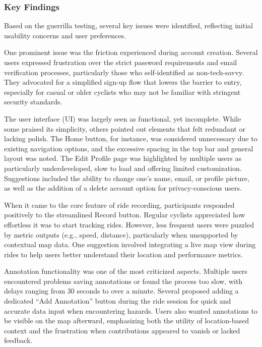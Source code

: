 \subsubsection{Key Findings}

Based on the guerrilla testing, several key issues were identified, reflecting initial usability concerns and user preferences.

One prominent issue was the friction experienced during account creation. Several users expressed frustration over the strict password requirements and email verification processes, particularly those who self-identified as non-tech-savvy. They advocated for a simplified sign-up flow that lowers the barrier to entry, especially for casual or older cyclists who may not be familiar with stringent security standards.

The user interface (UI) was largely seen as functional, yet incomplete. While some praised its simplicity, others pointed out elements that felt redundant or lacking polish. The Home button, for instance, was considered unnecessary due to existing navigation options, and the excessive spacing in the top bar and general layout was noted. The Edit Profile page was highlighted by multiple users as particularly underdeveloped, slow to load and offering limited customization. Suggestions included the ability to change one's name, email, or profile picture, as well as the addition of a delete account option for privacy-conscious users.

When it came to the core feature of ride recording, participants responded positively to the streamlined Record button. Regular cyclists appreciated how effortless it was to start tracking rides. However, less frequent users were puzzled by metric outputs (e.g., speed, distance), particularly when unsupported by contextual map data. One suggestion involved integrating a live map view during rides to help users better understand their location and performance metrics.

Annotation functionality was one of the most criticized aspects. Multiple users encountered problems saving annotations or found the process too slow, with delays ranging from 30 seconds to over a minute. Several proposed adding a dedicated “Add Annotation” button during the ride session for quick and accurate data input when encountering hazards. Users also wanted annotations to be visible on the map afterward, emphasizing both the utility of location-based context and the frustration when contributions appeared to vanish or lacked feedback.

